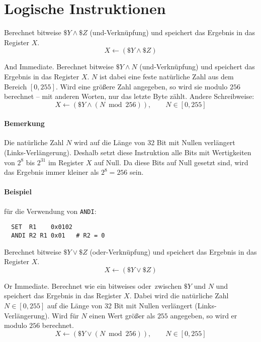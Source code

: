 \section{Logische Instruktionen}

Berechnet bitweise $\$Y \land \$Z$ (und-Verknüpfung) und speichert das Ergebnis
in das Register $X$.
\[
    X \gets (\$Y \land \$Z)
\]


\glqq And Immediate\grqq. Berechnet bitweise $\$Y \land N$ (und-Verknüpfung) und
speichert das Ergebnis in das Register $X$. $N$ ist dabei eine feste natürliche
Zahl aus dem Bereich $[0, 255]$. Wird eine größere Zahl angegeben, so wird sie
modulo $256$ berechnet -- mit anderen Worten, nur das letzte Byte zählt.
Andere Schreibweise:
\[
    X \gets (\$Y \land (N \bmod 256)), \qquad N \in [0, 255]
\]
\paragraph{Bemerkung}
Die natürliche Zahl $N$ wird auf die Länge von 32 Bit mit Nullen verlängert
(Links-Verlängerung). Deshalb setzt diese Instruktion alle Bits mit Wertigkeiten
von $2^{8}$ bis $2^{31}$ im Register $X$ auf Null. Da diese Bits auf Null
gesetzt sind, wird das Ergebnis immer kleiner als $2^{8} = 256$ sein.

\paragraph{Beispiel}
für die Verwendung von \texttt{ANDI}:
\begin{lstlisting}
  SET  R1    0x0102
  ANDI R2 R1 0x01   # R2 = 0
\end{lstlisting}



Berechnet bitweise $\$Y \lor \$Z$ (oder-Verknüpfung) und speichert das Ergebnis
in das Register $X$.
\[
    X \gets (\$Y \lor \$Z)
\]


\glqq Or Immediate\grqq.
Berechnet wie  ein bitweises \glqq oder\grqq\ zwischen $\$Y$ und $N$
und speichert das Ergebnis in das Register $X$. Dabei wird die natürliche Zahl
$N \in [0, 255]$ auf die Länge von 32 Bit mit Nullen verlängert
(Links-Verlängerung). Wird für $N$ einen Wert größer als $255$ angegeben, so
wird er modulo $256$ berechnet.
\[
    X \gets (\$Y \lor (N \bmod 256)), \qquad N \in [0, 255]
\]


